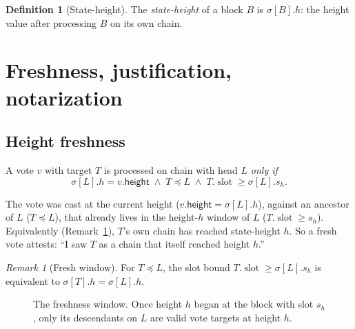 \documentclass{article}
\newcommand{\genesis}{\ensuremath{B_{\mathrm{gen}}}}
\newcommand{\slot}{\operatorname{\mathrm{slot}}}
\newcommand{\height}{\mathsf{height}}
\theoremstyle{plain}
\theoremstyle{definition}
\newtheorem{definition}[theorem]{Definition}
\theoremstyle{remark}
\newtheorem{remark}[theorem]{Remark}
\begin{document}
\begin{definition}[State-height]\label{def:sheight}
The \emph{state-height} of a block $B$ is $\sigma[B].h$: the height value after processing $B$ on its own chain.
\end{definition}

\section{Freshness, justification, notarization}\label{sec:fresh-just-notar}

\subsection{Height freshness}\label{sec:freshness}

A vote $v$ with target $T$ is processed on chain with head $L$ \emph{only if}
\[
  \sigma[L].h = v.\height \;\wedge\; T \preceq L \;\wedge\; T.\slot \geq \sigma[L].s_h.
\]

\begin{intuition}
The vote was cast at the current height ($v.\height = \sigma[L].h$), against an ancestor of $L$ ($T \preceq L$), that already lives in the height-$h$ window of $L$ ($T.\slot \geq s_h$). Equivalently (Remark~\ref{rem:fresh-equiv}), $T$'s own chain has reached state-height $h$. So a fresh vote attests: ``I saw $T$ as a chain that itself reached height $h$.''
\end{intuition}

\begin{remark}[Fresh window]\label{rem:fresh-equiv}
For $T \preceq L$, the slot bound $T.\slot \geq \sigma[L].s_h$ is equivalent to $\sigma[T].h = \sigma[L].h$.
\end{remark}

\begin{figure}[H]
\centering
{}
\caption{The freshness window. Once height $h$ began at the block with slot $s_h$, only its descendants on $L$ are valid vote targets at height $h$.}\label{fig:freshness}
\end{figure}
\end{document}
